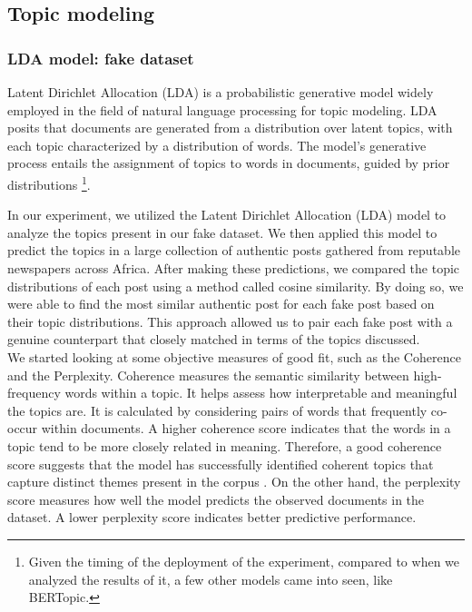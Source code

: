 \subsection{Topic modeling}

\subsubsection{LDA model: fake dataset}
\label{lda_fake}

Latent Dirichlet Allocation (LDA) is a probabilistic generative model widely employed in the field of natural language processing for topic modeling. LDA posits that documents are generated from a distribution over latent topics, with each topic characterized by a distribution of words. The model's generative process entails the assignment of topics to words in documents, guided by prior distributions \cite{Blei-LDA}\footnote{Given the timing of the deployment of the experiment, compared to when we analyzed the results of it, a few other models came into seen, like BERTopic.}. 

In our experiment, we utilized the Latent Dirichlet Allocation (LDA) model to analyze the topics present in our fake dataset. We then applied this model to predict the topics in a large collection of authentic posts gathered from reputable newspapers across Africa. After making these predictions, we compared the topic distributions of each post using a method called cosine similarity. By doing so, we were able to find the most similar authentic post for each fake post based on their topic distributions. This approach allowed us to pair each fake post with a genuine counterpart that closely matched in terms of the topics discussed.\\

We started looking at some objective measures of good fit, such as the Coherence and the Perplexity. Coherence measures the semantic similarity between high-frequency words within a topic. It helps assess how interpretable and meaningful the topics are. It is calculated by considering pairs of words that frequently co-occur within documents. A higher coherence score indicates that the words in a topic tend to be more closely related in meaning. Therefore, a good coherence score suggests that the model has successfully identified coherent topics that capture distinct themes present in the corpus \cite{CohMeasure}. On the other hand, the perplexity score measures how well the model predicts the observed documents in the dataset. A lower perplexity score indicates better predictive performance.\\

